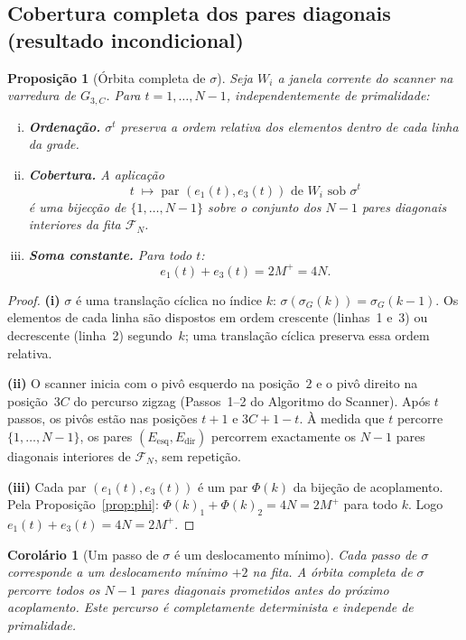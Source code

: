 \documentclass[12pt, a4paper]{article}
\theoremstyle{plain}
\newtheorem{proposition}[theorem]{Proposição}
\newtheorem{corollary}[theorem]{Corolário}
\theoremstyle{definition}
\theoremstyle{remark}
\begin{document}
	\subsection{Cobertura completa dos pares diagonais
		(resultado incondicional)}
	
	\begin{proposition}[Órbita completa de $\sigma$]
		\label{prop:orbita}
		Seja $W_i$ a janela corrente do scanner na varredura de $G_{3,C}$.
		Para $t=1,\ldots,N-1$, independentemente de primalidade:
		\begin{enumerate}[(i)]
			\item \textbf{Ordenação.}  $\sigma^t$ preserva a ordem relativa
			dos elementos dentro de cada linha da grade.
			\item \textbf{Cobertura.}  A aplicação
			\[
			t \;\mapsto\;
			\text{par }(e_1(t),e_3(t))\text{ de }W_i
			\text{ sob }\sigma^t
			\]
			é uma bijecção de $\{1,\ldots,N-1\}$ sobre o conjunto
			dos $N-1$ pares diagonais interiores da fita
			$\mathcal{F}_N$.
			\item \textbf{Soma constante.}  Para todo $t$:
			\[
			e_1(t) + e_3(t) = 2M^+ = 4N.
			\]
		\end{enumerate}
	\end{proposition}
	
	\begin{proof}
		\textbf{(i)}  $\sigma$ é uma translação cíclica no índice $k$:
		$\sigma(\sigma_G(k))=\sigma_G(k-1)$.  Os elementos de cada linha
		são dispostos em ordem crescente (linhas~1 e~3) ou decrescente
		(linha~2) segundo~$k$; uma translação cíclica preserva essa ordem
		relativa.
		
		\textbf{(ii)}  O scanner inicia com o pivô esquerdo na posição~$2$
		e o pivô direito na posição~$3C$ do percurso zigzag
		(Passos~1--2 do Algoritmo do Scanner).  Após $t$ passos,
		os pivôs estão nas posições $t+1$ e $3C+1-t$.  À medida que
		$t$ percorre $\{1,\ldots,N-1\}$, os pares
		$(E_{\text{esq}},E_{\text{dir}})$ percorrem exactamente os
		$N-1$ pares diagonais interiores de $\mathcal{F}_N$,
		sem repetição.
		
		\textbf{(iii)}  Cada par $(e_1(t),e_3(t))$ é um par $\Phi(k)$
		da bijeção de acoplamento.  Pela Proposição~\ref{prop:phi}:
		$\Phi(k)_1+\Phi(k)_2=4N=2M^+$ para todo $k$.
		Logo $e_1(t)+e_3(t)=4N=2M^+$.
	\end{proof}
	
	\begin{corollary}[Um passo de $\sigma$ é um deslocamento mínimo]
		\label{cor:sigma-desloc}
		Cada passo de $\sigma$ corresponde a um deslocamento mínimo $+2$
		na fita.  A órbita completa de $\sigma$ percorre todos os $N-1$
		pares diagonais prometidos antes do próximo acoplamento.  Este
		percurso é completamente determinista e independe de primalidade.
	\end{corollary}
	
\end{document}
